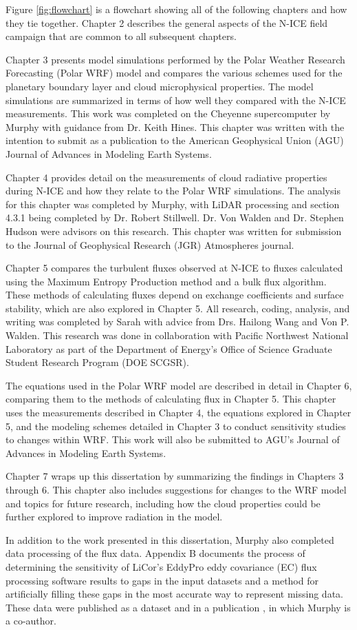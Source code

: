 Figure \ref{fig:flowchart} is a flowchart showing all of the following chapters and how they tie together. Chapter 2 describes the general aspects of the N-ICE field campaign that are common to all subsequent chapters. 

Chapter 3 presents model simulations performed by the Polar Weather Research Forecasting (Polar WRF) model and compares the various schemes used for the planetary boundary layer and cloud microphysical properties. The model simulations are summarized in terms of how well they compared with the N-ICE measurements. This work was completed on the Cheyenne \citep{cheyenne} supercomputer by Murphy with guidance from Dr. Keith Hines. This chapter was written with the intention to submit as a publication to the American Geophysical Union (AGU) Journal of Advances in Modeling Earth Systems.

Chapter 4 provides detail on the measurements of cloud radiative properties during N-ICE and how they relate to the Polar WRF simulations. The analysis for this chapter was completed by Murphy, with LiDAR processing and section 4.3.1 being completed by Dr. Robert Stillwell. Dr. Von Walden and Dr. Stephen Hudson were advisors on this research. This chapter was written for submission to the Journal of Geophysical Research (JGR) Atmospheres journal.

Chapter 5 compares the turbulent fluxes observed at N-ICE to fluxes calculated using the Maximum Entropy Production method and a bulk flux algorithm. These methods of calculating fluxes depend on exchange coefficients and surface stability, which are also explored in Chapter 5. All research, coding, analysis, and writing was completed by Sarah with advice from Drs. Hailong Wang and Von P. Walden. This research was done in collaboration with Pacific Northwest National Laboratory as part of the Department of Energy's Office of Science Graduate Student Research Program (DOE SCGSR). 

The equations used in the Polar WRF model are described in detail in Chapter 6, comparing them to the methods of calculating flux in Chapter 5. This chapter uses the measurements described in Chapter 4, the equations explored in Chapter 5, and the modeling schemes detailed in Chapter 3 to conduct sensitivity studies to changes within WRF. This work will also be submitted to AGU's Journal of Advances in Modeling Earth Systems.

Chapter 7 wraps up this dissertation by summarizing the findings in Chapters 3 through 6. This chapter also includes suggestions for changes to the WRF model and topics for future research, including how the cloud properties could be further explored to improve radiation in the model.

In addition to the work presented in this dissertation, Murphy also completed data processing of the flux data. Appendix B documents the process of determining the sensitivity of LiCor's EddyPro eddy covariance (EC) flux processing software results to gaps in the input datasets and a method for artificially filling these gaps in the most accurate way to represent missing data. These data were published as a dataset \citep{niceflux} and in a publication \citep{walden:2017}, in which Murphy is a co-author.